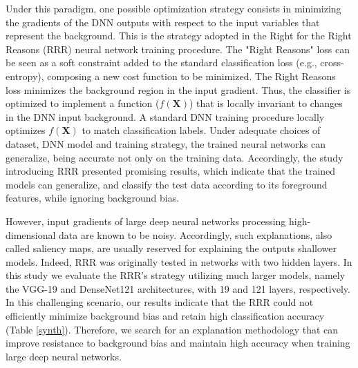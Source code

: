 \documentclass[fleqn,10pt]{wlscirep}
\begin{document}
{Under this paradigm, one possible optimization strategy consists in minimizing the gradients of the DNN outputs with respect to the input variables that represent the background. This is the strategy adopted in the Right for the Right Reasons (RRR) neural network training procedure\cite{RRR}. The "Right Reasons" loss\cite{RRR} can be seen as a soft constraint added to the standard classification loss (e.g., cross-entropy), composing a new cost function to be minimized. The Right Reasons loss minimizes the background region in the input gradient. Thus, the classifier is optimized to implement a function ($f(\bm{X})$) that is locally invariant to changes in the DNN input background. A standard DNN training procedure locally optimizes $f(\bm{X})$ to match classification labels. Under adequate choices of dataset, DNN model and training strategy, the trained neural networks can generalize, being accurate not only on the training data. Accordingly, the study introducing RRR presented promising results, which indicate that the trained models can generalize, and classify the test data according to its foreground features, while ignoring background bias\cite{RRR}.

However, input gradients of large deep neural networks processing high-dimensional data are known to be noisy\cite{LRPvsGrad}. Accordingly, such explanations, also called saliency maps\cite{saliency}, are usually reserved for explaining the outputs shallower models\cite{LRPvsGrad}. Indeed, RRR was originally tested in networks with two hidden layers\cite{RRR}. In this study we evaluate the RRR's strategy utilizing much larger models, namely the VGG-19 and DenseNet121 architectures, with 19 and 121 layers, respectively. In this challenging scenario, our results indicate that the RRR could not efficiently minimize background bias and retain high classification accuracy (Table \ref{synth}). Therefore, we search for an explanation methodology that can improve resistance to background bias and maintain high accuracy when training large deep neural networks.

}
\end{document}
